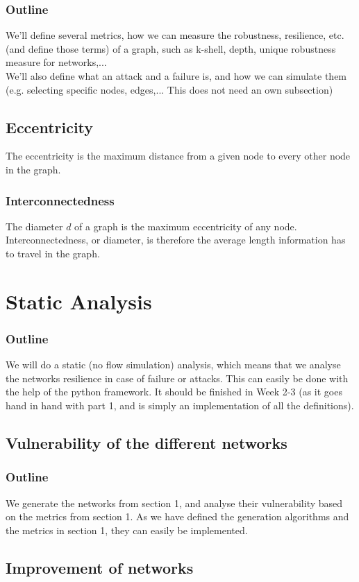 \documentclass[11pt]{article}
\begin{document}
\subsubsection{Outline}
We'll define several metrics, how we can measure the robustness, resilience, etc. (and define those terms) of a graph, such as k-shell, depth, unique robustness measure for networks,... \\
We'll also define what an attack and a failure is, and how we can simulate them (e.g. selecting specific nodes, edges,... This does not need an own subsection)
\subsection{Eccentricity}
The eccentricity is the maximum distance from a given node to every other node in the graph. 
\subsubsection{Interconnectedness}
The diameter $d$ of a graph is the maximum eccentricity of any node. Interconnectedness, or diameter, is therefore the average length information has to travel in the graph.\cite{albert2000error} 
\section{Static Analysis} %
\subsubsection{Outline}
We will do a static (no flow simulation) analysis, which means that we analyse the networks resilience in case of failure or attacks. This can easily be done with the help of the python framework. It should be finished in Week 2-3 (as it goes hand in hand with part 1, and is simply an implementation of all the definitions).
\subsection{Vulnerability of the different networks}
\subsubsection{Outline}
We generate the networks from section 1, and analyse their vulnerability based on the metrics from section 1. As we have defined the generation algorithms and the metrics in section 1, they can easily be implemented.
\subsection{Improvement of networks}
\end{document}
